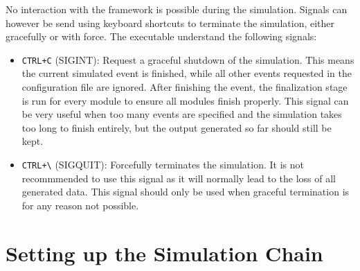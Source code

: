 No interaction with the framework is possible during the simulation. Signals can however be send using keyboard shortcuts to terminate the simulation, either gracefully or with force. The executable understand the following signals:
\begin{itemize}
\item \texttt{CTRL+C} (SIGINT): Request a graceful shutdown of the simulation. This means the current simulated event is finished, while all other events requested in the configuration file are ignored. After finishing the event, the finalization stage is run for every module to ensure all modules finish properly. This signal can be very useful when too many events are specified and the simulation takes too long to finish entirely, but the output generated so far should still be kept.
\item \texttt{CTRL+\textbackslash} (SIGQUIT): Forcefully terminates the simulation. It is not recommmended to use this signal as it will normally lead to the loss of all generated data. This signal should only be used when graceful termination is for any reason not possible.
\end{itemize}


\section{Setting up the Simulation Chain}
\label{sec:setting_up_simulation_chain}

